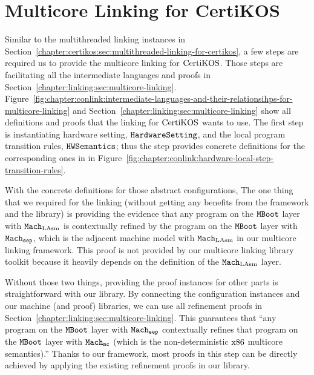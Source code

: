 \section{Multicore Linking for CertiKOS}
\label{chapter:certikos:sec:multicore-linking-for-certikos}

Similar to the multithreaded linking instances in Section~\ref{chapter:certikos:sec:multithreaded-linking-for-certikos}, a few steps are required us to provide the multicore linking for $\mathrm{CertiKOS}$.
Those steps are facilitating all the intermediate languages
and proofs in Section~\ref{chapter:linking:sec:multicore-linking}.
Figure~\ref{fig:chapter:conlink:intermediate-languages-and-their-relationsihps-for-multicore-linking} and 
Section~\ref{chapter:linking:sec:multicore-linking} show all definitions and 
proofs that the linking for $\mathrm{CertiKOS}$ wants to use. 
The first step is instantiating hardware setting, ${{\mathrm{\texttt{HardwareSetting}}}}$, and the local program transition rules, ${{\mathrm{\texttt{HWSemantics}}}}$;
thus the step provides concrete definitions for the corresponding ones in 
 in Figure~\ref{fig:chapter:conlink:hardware-local-step-transition-rules}.

With the concrete definitions for those abstract configurations, 
The one thing that we required for the linking (without getting any benefits from the framework and the library)
is providing the evidence that any program on the ${\mathrm{\texttt{MBoot}}}$ layer with ${\mathrm{\texttt{Mach}}}_{\mathrm{LAsm}}$ is contextually refined by the program on the ${\mathrm{\texttt{MBoot}}}$ layer with ${{{\mathrm{\texttt{Mach}}}}_{{\mathrm{\texttt{sep}}}}}$, which is the adjacent machine model with ${\mathrm{\texttt{Mach}}}_{\mathrm{LAsm}}$ in our multicore linking framework. This proof is not provided by our multicore linking library toolkit because it heavily depends on the definition of the ${\mathrm{\texttt{Mach}}}_{\mathrm{LAsm}}$ layer.

Without those two things, 
providing the proof instances for other parts is straightforward with our library. 
By connecting the configuration instances and our machine (and proof) libraries, 
we can use all refinement proofs in Section~\ref{chapter:linking:sec:multicore-linking}. 
This guarantees that ``any program on the ${\mathrm{\texttt{MBoot}}}$ layer with ${{{\mathrm{\texttt{Mach}}}}_{{\mathrm{\texttt{sep}}}}}$ contextually refines that program on the ${\mathrm{\texttt{MBoot}}}$ layer with ${{{{\mathrm{\texttt{Mach}}}}_{\mathrm{\texttt{mc}}}}}$ (which is the non-deterministic $\mathrm{x86}$ multicore semantics).''
Thanks to our framework, most proofs in this step can be directly achieved by applying the existing refinement proofs in our library.
%
